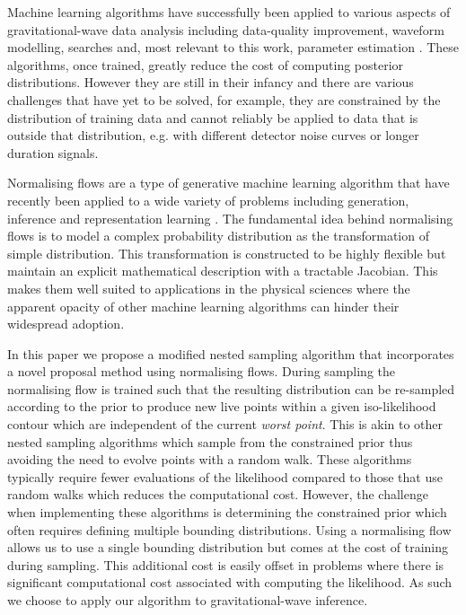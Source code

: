 \documentclass[%
 reprint,
nofootinbib,
 amsmath,amssymb,
 aps,
 prd,
]{revtex4-2}
\begin{document}
Machine learning algorithms have successfully been applied to various aspects of gravitational-wave data analysis  \cite{Cuoco:2020:egwml} including data-quality improvement, waveform modelling, searches and, most relevant to this work, parameter estimation \cite{Gabbard:2019,Chua:2019,Green:2020a,Green:2020complete}. These algorithms, once trained, greatly reduce the cost of computing posterior distributions. However they are still in their infancy and there are various challenges that have yet to be solved, for example, they are constrained by the distribution of training data and cannot reliably be applied to data that is outside that distribution, e.g. with different detector noise curves or longer duration signals.

Normalising flows are a type of generative machine learning algorithm that have recently been applied to a wide variety of problems including generation, inference and representation learning \cite{Kobyzev:2019nf,Paramakarios:2019nfpmi}. The fundamental idea behind normalising flows is to model a complex probability distribution as the transformation of simple distribution. This transformation is constructed to be highly flexible but maintain an explicit mathematical description with a tractable Jacobian. This makes them well suited to applications in the physical sciences where the apparent opacity of other machine learning algorithms can hinder their widespread adoption.

In this paper we propose a modified nested sampling algorithm that incorporates a novel proposal method using normalising flows. During sampling the normalising flow is trained such that the resulting distribution can be re-sampled according to the prior to produce new live points within a given iso-likelihood contour which are independent of the current \textit{worst point}. This is akin to other nested sampling algorithms which sample from the constrained prior thus avoiding the need to evolve points with a random walk. These algorithms typically require fewer evaluations of the likelihood compared to those that use random walks which reduces the computational cost. However, the challenge when implementing these algorithms is determining the constrained prior which often requires defining multiple bounding distributions. Using a normalising flow allows us to use a single bounding distribution but comes at the cost of training during sampling. This additional cost is easily offset in problems where there is significant computational cost associated with computing the likelihood. As such we choose to apply our algorithm to gravitational-wave inference.
\end{document}
